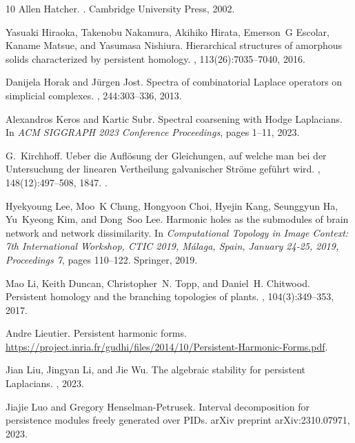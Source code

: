 \documentclass[10pt,a4paper]{amsart}
\theoremstyle{definition}
\theoremstyle{remark}
\begin{document}
\begin{thebibliography}{10}
Allen Hatcher.
.
\newblock Cambridge University Press, 2002.

Yasuaki Hiraoka, Takenobu Nakamura, Akihiko Hirata, Emerson~G Escolar, Kaname
  Matsue, and Yasumasa Nishiura.
\newblock Hierarchical structures of amorphous solids characterized by
  persistent homology.
,
  113(26):7035--7040, 2016.

Danijela Horak and J{\"u}rgen Jost.
\newblock Spectra of combinatorial {L}aplace operators on simplicial complexes.
, 244:303--336, 2013.

Alexandros Keros and Kartic Subr.
\newblock Spectral coarsening with {H}odge {L}aplacians.
\newblock In {\em ACM SIGGRAPH 2023 Conference Proceedings}, pages 1--11, 2023.

G.~Kirchhoff.
\newblock Ueber die {A}ufl{\"o}sung der {G}leichungen, auf welche man bei der
  {U}ntersuchung der linearen {V}ertheilung galvanischer {S}tr{\"o}me
  gef{\"u}hrt wird.
, 148(12):497--508, 1847.
\newblock \href {https://doi.org/10.1002/andp.18471481202}
  {}.

Hyekyoung Lee, Moo~K Chung, Hongyoon Choi, Hyejin Kang, Seunggyun Ha, Yu~Kyeong
  Kim, and Dong~Soo Lee.
\newblock Harmonic holes as the submodules of brain network and network
  dissimilarity.
\newblock In {\em Computational Topology in Image Context: 7th International
  Workshop, CTIC 2019, M{\'a}laga, Spain, January 24-25, 2019, Proceedings 7},
  pages 110--122. Springer, 2019.

Mao Li, Keith Duncan, Christopher~N. Topp, and Daniel~H. Chitwood.
\newblock Persistent homology and the branching topologies of plants.
, 104(3):349--353, 2017.

Andre Lieutier.
\newblock Persistent harmonic forms.
\newblock
  \url{https://project.inria.fr/gudhi/files/2014/10/Persistent-Harmonic-Forms.pdf}.

Jian Liu, Jingyan Li, and Jie Wu.
\newblock The algebraic stability for persistent {L}aplacians.
, 2023.

Jiajie Luo and Gregory Henselman-Petrusek.
\newblock Interval decomposition for persistence modules freely generated over
  {PIDs}.
\newblock arXiv preprint arXiv:2310.07971, 2023.


\end{thebibliography}
\end{document}
